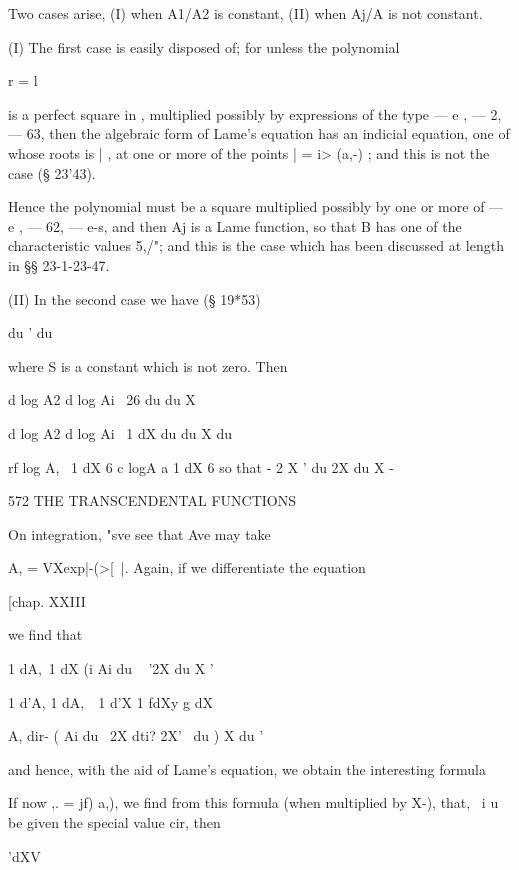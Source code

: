 {{{{{{{{Two cases arise, (I) when A1/A2 is constant, (II) when Aj/A  is not 
constant. 

(I) The first case is easily disposed of; for unless the polynomial 

r = l 

is a perfect square in  , multiplied possibly by expressions of the type   — e , 
  —  2,   — 63, then the algebraic form of Lame's equation has an indicial 
equation, one of whose roots is | , at one or more of the points |  =  i> (a,-) ; and 
this is not the case (§ 23'43). 

Hence the polynomial must be a square multiplied possibly by one or 
more of   — e ,   — 62,   — e-s, and then Aj is a Lame function, so that B has 
one of the characteristic values 5,/"; and this is the case which has been 
discussed at length in §§ 23-1-23-47. 

(II) In the second case we have (§ 19*53) 

du ' du 

where S is a constant which is not zero. Then 

d log A2 d log Ai \  26 
du du X 

d log A2 d log Ai \  1 dX 
du du X du 

rf log A, \  1 dX 6 c  logA a  1 dX 6 
so that    - 2   X ' du 2X du   X - 



572 THE TRANSCENDENTAL FUNCTIONS 

On integration, "sve see that Ave may take 

A, = VXexp|-(>[~|. 
Again, if we differentiate the equation 



[chap. XXIII 



we find that 



1 dA,\  1 dX (i 
Ai du ~ '2X du X ' 



1 d'A,  1 dA,\ \   1 d'X 1 fdXy g dX 



A, dir- ( Ai du \ 2X dti? 2X' \ du ) X  du ' 

and hence, with the aid of Lame's equation, we obtain the interesting 
formula 

If now  ,. = jf)  a,), we find from this formula (when multiplied by X-), 
that, \ i u be given the special value cir, then 



'dXV 



}}}}}}}}
